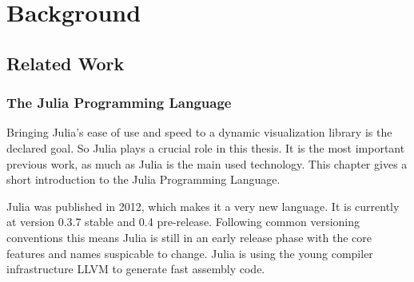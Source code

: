 \section{Background}


\subsection{Related Work}

\subsubsection{The Julia Programming Language}
Bringing Julia's ease of use and speed to a dynamic visualization library is the declared goal.
So Julia plays a crucial role in this thesis. 
It is the most important previous work, as much as Julia is the main used technology.
This chapter gives a short introduction to the Julia Programming Language.

Julia was published in 2012, which makes it a very new language. It is currently at version 0.3.7 stable and 0.4 pre-release.
Following common versioning conventions this means Julia is still in an early release phase with the core features and names suspicable to change.
Julia is using the young compiler infrastructure \ac{LLVM} to generate fast assembly code.

